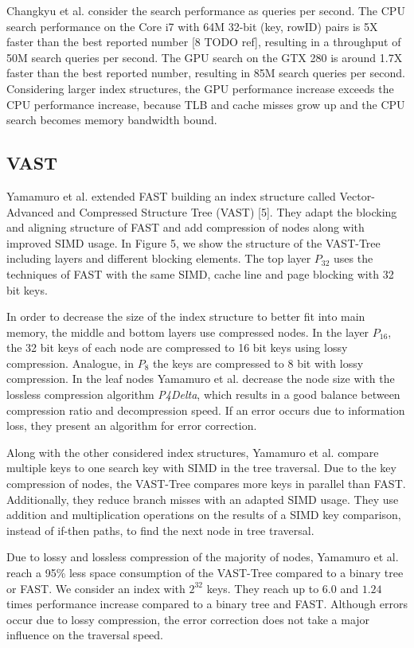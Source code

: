 \documentclass[conference]{IEEEtran}
\begin{document}
Changkyu et al. consider the search performance as queries per second. The CPU search performance on the Core i7 with 64M 32-bit (key, rowID) pairs is 5X faster than the best reported number [8 TODO ref], resulting in a throughput of 50M search queries per second. The GPU search on the GTX 280 is around 1.7X faster than the best reported number, resulting in 85M search queries per second. Considering larger index structures, the GPU performance increase exceeds the CPU performance increase, because TLB and cache misses grow up and the CPU search becomes memory bandwidth bound.

\subsection{VAST}\label{SCM}
Yamamuro et al. extended FAST building an index structure called Vector-Advanced and Compressed Structure Tree (VAST) [5]. They adapt the blocking and aligning structure of FAST and add compression of nodes along with improved SIMD usage. In Figure 5, we show the structure of the VAST-Tree including layers and different blocking elements. The top layer $P_{32}$ uses the techniques of FAST with the same SIMD, cache line and page blocking with 32 bit keys.

In order to decrease the size of the index structure to better fit into main memory, the middle and bottom layers use compressed nodes. In the layer $P_{16}$, the 32 bit keys of each node are compressed to 16 bit keys using lossy compression. Analogue, in $P_8$ the keys are compressed to 8 bit with lossy compression. In the leaf nodes Yamamuro et al. decrease the node size with the lossless compression algorithm \emph{P4Delta}, which results in a good balance between compression ratio and decompression speed. If an error occurs due to information loss, they present an algorithm for error correction.

Along with the other considered index structures, Yamamuro et al. compare multiple keys to one search key with SIMD in the tree traversal. Due to the key compression of nodes, the VAST-Tree compares more keys in parallel than FAST. Additionally, they reduce branch misses with an adapted SIMD usage. They use addition and multiplication operations on the results of a SIMD key comparison, instead of if-then paths, to find the next node in tree traversal.

Due to lossy and lossless compression of the majority of nodes, Yamamuro et al. reach a 95\% less space consumption of the VAST-Tree compared to a binary tree or FAST. We consider an index with $2^{32}$ keys. They reach up to $6.0$ and $1.24$ times performance increase compared to a binary tree and FAST. Although errors occur due to lossy compression, the error correction does not take a major influence on the traversal speed.
\end{document}
